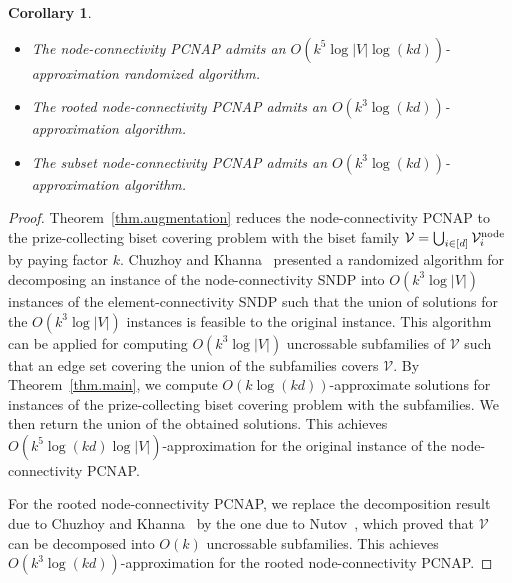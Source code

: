 \documentclass[11pt]{article}
\newtheorem{corollary}{Corollary}
\newcommand{\Vfam}{\mathcal{V}}
\begin{document}
\begin{corollary}\label{cor.node}
\begin{itemize}
 \item[\rm (i)] The node-connectivity PCNAP admits an
	      $O(k^5 \log |V|\log(kd))$-approximation randomized algorithm.
 \item[\rm (ii)] The rooted node-connectivity PCNAP admits an
	      $O(k^3 \log(kd))$-approximation algorithm.
 \item[\rm (iii)] The subset node-connectivity PCNAP admits an
	      $O(k^3 \log(kd))$-approximation algorithm.
\end{itemize}
 \end{corollary}
\begin{proof}
 Theorem~\ref{thm.augmentation}
 reduces the node-connectivity PCNAP
 to the prize-collecting biset covering problem with the biset family
 $\Vfam=\bigcup_{i\in [d]}\Vfam^{\rm node}_i$ by paying factor $k$.
 Chuzhoy and Khanna~\cite{ChuzhoyK12} presented a randomized algorithm
 for decomposing an instance of the node-connectivity SNDP into 
 $O(k^3 \log |V|)$ instances of the element-connectivity SNDP such that
 the union of solutions for the $O(k^3 \log |V|)$ instances is 
 feasible to the original instance.
 This algorithm can be applied for
 computing $O(k^3 \log |V|)$  
 uncrossable subfamilies of $\Vfam$
 such that an edge set covering the union of the subfamilies
 covers $\Vfam$.
 By Theorem~\ref{thm.main}, 
 we compute $O(k \log (kd))$-approximate solutions for
 instances of 
 the prize-collecting biset covering problem 
 with the subfamilies. We then return the union of the obtained solutions.
 This achieves
 $O(k^5 \log (kd) \log |V|)$-approximation for the original instance
 of the node-connectivity PCNAP.

 For the rooted node-connectivity PCNAP, 
 we replace the decomposition result due to Chuzhoy and Khanna~\cite{ChuzhoyK12} by
 the one due to Nutov~\cite{Nutov12uncrossable}, which proved
 that $\Vfam$
 can be decomposed into $O(k)$ uncrossable subfamilies.
 This achieves $O(k^3 \log (kd))$-approximation for the rooted
 node-connectivity PCNAP.


\end{proof}
\end{document}
